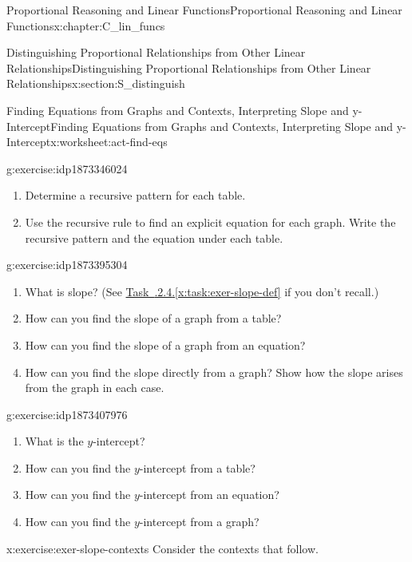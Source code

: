 \documentclass[oneside,10pt,]{book}
\newcommand{\xreffont}{\relax}
\numberwithin{equation}{chapter}
\newcommand{\hrulethin}  {\noalign{\hrule height 0.04em}}
\begin{document}
\begin{chapterptx}{Proportional Reasoning and Linear Functions}{}{Proportional Reasoning and Linear Functions}{}{}{x:chapter:C_lin_funcs}
\begin{sectionptx}{Distinguishing Proportional Relationships from Other Linear Relationships}{}{Distinguishing Proportional Relationships from Other Linear Relationships}{}{}{x:section:S_distinguish}
\begin{worksheet-subsection}{Finding Equations from Graphs and Contexts, Interpreting Slope and y-Intercept}{}{Finding Equations from Graphs and Contexts, Interpreting Slope and y-Intercept}{}{}{x:worksheet:act-find-eqs}
\begin{divisionexercise}{2}{}{}{g:exercise:idp1873346024}
\begin{enumerate}[font=\bfseries,label=(\alph*),ref=\alph*]
\begin{sidebyside}{4}{0}{0}{0}
\begin{sbspanel}{0.25}
\begin{tableptx}{\textbf{Graph D (Red)}}{x:table:tbl-line-four}{}
{{{\begin{tabular}{Acc}
&\tabularnewline\hrulethin
\end{tabular}
}%
\par}
}%
\end{tableptx}%
\end{sbspanel}%
\end{sidebyside}%
\item{}Determine a recursive pattern for each table.%
\item{}Use the recursive rule to find an explicit equation for each graph. Write the recursive pattern and the equation under each table.%
\end{enumerate}
\end{divisionexercise}%
\begin{divisionexercise}{3}{}{}{g:exercise:idp1873395304}%
\begin{enumerate}[font=\bfseries,label=(\alph*),ref=\alph*]
\item{}What is slope? (See \hyperref[x:task:exer-slope-def]{Task~{\xreffont 2.4.2.4}.{\xreffont\ref{x:task:exer-slope-def}}} if you don't recall.)%
\item{}How can you find the slope of a graph from a table?%
\item{}How can you find the slope of a graph from an equation?%
\item{}How can you find the slope directly from a graph? Show how the slope arises from the graph in each case.%
\end{enumerate}
\end{divisionexercise}%
\begin{divisionexercise}{4}{}{}{g:exercise:idp1873407976}%
\begin{enumerate}[font=\bfseries,label=(\alph*),ref=\alph*]
\item{}What is the \(y\)-intercept?%
\item{}How can you find the \(y\)-intercept from a table?%
\item{}How can you find the \(y\)-intercept from an equation?%
\item{}How can you find the \(y\)-intercept from a graph?%
\end{enumerate}
\end{divisionexercise}%
\begin{divisionexercise}{5}{}{}{x:exercise:exer-slope-contexts}%
Consider the contexts that follow.%

\end{divisionexercise}
\end{worksheet-subsection}
\end{sectionptx}
\end{chapterptx}
\end{document}
